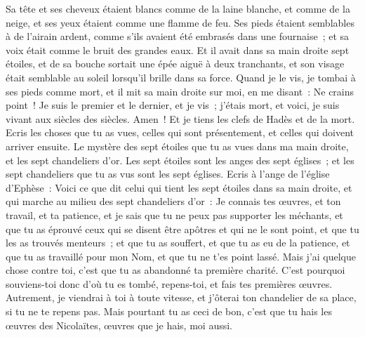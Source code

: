 \begin{multicols}{2}
Sa tête et ses cheveux étaient blancs comme de la laine blanche, et comme de la neige, et ses yeux étaient comme une flamme de feu.
Ses pieds étaient semblables à de l'airain ardent, comme s'ils avaient été embrasés dans une fournaise~; et sa voix était comme le bruit des grandes eaux.
Et il avait dans sa main droite sept étoiles, et de sa bouche sortait une épée aiguë à deux tranchants, et son visage était semblable au soleil lorsqu'il brille dans sa force.
Quand je le vis, je tombai à ses pieds comme mort, et il mit sa main droite sur moi, en me disant~: Ne crains point~!
Je suis le premier et le dernier, et je vis~; j'étais mort, et voici, je suis vivant aux siècles des siècles. Amen~! Et je tiens les clefs de Hadès et de la mort.
Ecris les choses que tu as vues, celles qui sont présentement, et celles qui doivent arriver ensuite.
Le mystère des sept étoiles que tu as vues dans ma main droite, et les sept chandeliers d'or. Les sept étoiles sont les anges des sept églises~; et les sept chandeliers que tu as vus sont les sept églises.
\VerseOne{}Ecris à l'ange de l'église d'Ephèse~: Voici ce que dit celui qui tient les sept étoiles dans sa main droite, et qui marche au milieu des sept chandeliers d'or~:
Je connais tes œuvres, et ton travail, et ta patience, et je sais que tu ne peux pas supporter les méchants, et que tu as éprouvé ceux qui se disent être apôtres et qui ne le sont point, et que tu les as trouvés menteurs~;
et que tu as souffert, et que tu as eu de la patience, et que tu as travaillé pour mon Nom, et que tu ne t'es point lassé.
Mais j'ai quelque chose contre toi, c'est que tu as abandonné ta première charité.
C'est pourquoi souviens-toi donc d'où tu es tombé, repens-toi, et fais tes premières œuvres. Autrement, je viendrai à toi à toute vitesse, et j'ôterai ton chandelier de sa place, si tu ne te repens pas.
Mais pourtant tu as ceci de bon, c'est que tu hais les œuvres des Nicolaïtes, œuvres que je hais, moi aussi.

\end{multicols}
